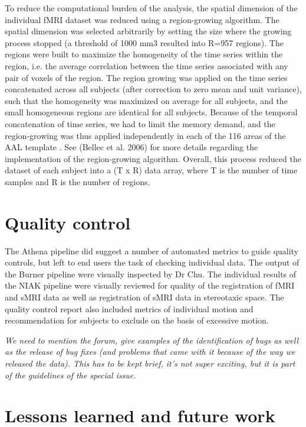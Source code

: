 \documentclass[preprint,12pt,1p]{elsarticle}
\begin{document}
To reduce the computational burden of the analysis, the spatial dimension of the individual fMRI dataset was reduced using a region-growing algorithm. The spatial dimension was selected arbitrarily by setting the size where the growing process stopped (a threshold of 1000 mm3 resulted into R=957 regions). The regions were built to maximize the homogeneity of the time series within the region, i.e. the average correlation between the time series associated with any pair of voxels of the region. The region growing was applied on the time series concatenated across all subjects (after correction to zero mean and unit variance), such that the homogeneity was maximized on average for all subjects, and the small homogeneous regions are identical for all subjects. Because of the temporal concatenation of time series, we had to limit the memory demand, and the region-growing was thus applied independently in each of the 116 areas of the AAL template \citep{Tzourio-Mazoyer2002}. See (Bellec et al. 2006) for more details regarding the implementation of the region-growing algorithm. Overall, this process reduced the dataset of each subject into a (T x R) data array, where T is the number of time samples and R is the number of regions.

\section{Quality control}

The Athena pipeline did suggest a number of automated metrics to guide quality controls, but left to end users the task of checking individual data. The output of the Burner pipeline were visually inspected by Dr Chu. The individual results of the NIAK pipeline were visually reviewed for quality of the registration of fMRI and sMRI data as well as registration of sMRI data in stereotaxic space. The quality control report also included metrics of individual motion and recommendation for subjects to exclude on the basis of excessive motion. 

\emph{We need to mention the forum, give examples of the identification of bugs as well as the release of bug fixes (and problems that came with it because of the way we released the data). This has to be kept brief, it's not super exciting, but it is part of the guidelines of the special issue.}

\section{Lessons learned and future work}
\end{document}
